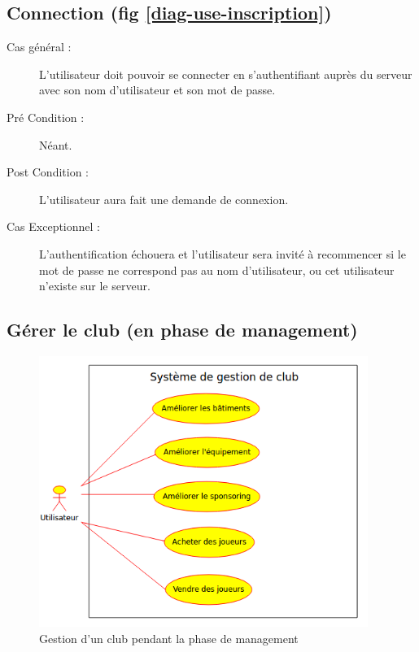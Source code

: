 \documentclass[a4paper]{report}
\begin{document}
\subsection{Connection (fig \ref{diag-use-inscription})}
\begin{description}
    \item[Cas général :] L'\gls{utilisateur} doit pouvoir se connecter en s'authentifiant auprès du \gls{serveur} avec son nom d'\gls{utilisateur} et son mot de passe.
    \item[Pré Condition  :] Néant.
    \item[Post Condition :] L'\gls{utilisateur} aura fait une demande de connexion.
    \item[Cas Exceptionnel :] L'authentification échouera et l'\gls{utilisateur} sera invité à recommencer si le mot de passe ne correspond pas au nom d'\gls{utilisateur}, ou cet \gls{utilisateur} n'existe sur le \gls{serveur}.
\end{description}

\subsection{Gérer le \gls{club} (en phase de management)}

\begin{figure}[H]
    \begin{center}
        \includegraphics[height=250pt]{uml/mngClub.png}
        \caption{\label{diag-use-management} Gestion d'un \gls{club} pendant la phase de management}
    \end{center}
\end{figure}
\end{document}
